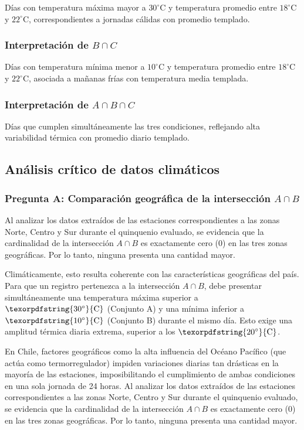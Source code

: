 \documentclass[12pt]{article}
\begin{document}
Días con temperatura máxima mayor a $30^{\circ}\text{C}$ y temperatura promedio entre $18^{\circ}\text{C}$ y $22^{\circ}\text{C}$, correspondientes a jornadas cálidas con promedio templado.

\subsubsection{Interpretación de $B \cap C$}

Días con temperatura mínima menor a $10^{\circ}\text{C}$ y temperatura promedio entre $18^{\circ}\text{C}$ y $22^{\circ}\text{C}$, asociada a mañanas frías con temperatura media templada.

\subsubsection{Interpretación de $A \cap B \cap C$}

Días que cumplen simultáneamente las tres condiciones, reflejando alta variabilidad térmica con promedio diario templado.

\subsection{Análisis crítico de datos climáticos}
\subsubsection{Pregunta A: Comparación geográfica de la intersección $A \cap B$}

Al analizar los datos extraídos de las estaciones correspondientes a las zonas Norte, Centro y Sur durante el quinquenio evaluado, se evidencia que la cardinalidad de la intersección $A \cap B$ es exactamente cero (0) en las tres zonas geográficas. Por lo tanto, ninguna presenta una cantidad mayor. 

Climáticamente, esto resulta coherente con las características geográficas del país. Para que un registro pertenezca a la intersección $A \cap B$, debe presentar simultáneamente una temperatura máxima superior a $\texorpdfstring{30^\circ}{\text{C}}$ (Conjunto A) y una mínima inferior a $\texorpdfstring{10^\circ}{\text{C}}$ (Conjunto B) durante el mismo día. Esto exige una amplitud térmica diaria extrema, superior a los $\texorpdfstring{20^{\circ}}{\text{C}}$. 

En Chile, factores geográficos como la alta influencia del Océano Pacífico (que actúa como termorregulador) impiden variaciones diarias tan drásticas en la mayoría de las estaciones, imposibilitando el cumplimiento de ambas condiciones en una sola jornada de 24 horas. Al analizar los datos extraídos de las estaciones correspondientes a las zonas Norte, Centro y Sur durante el quinquenio evaluado, se evidencia que la cardinalidad de la intersección $A \cap B$ es exactamente cero (0) en las tres zonas geográficas. Por lo tanto, ninguna presenta una cantidad mayor. 
\end{document}
